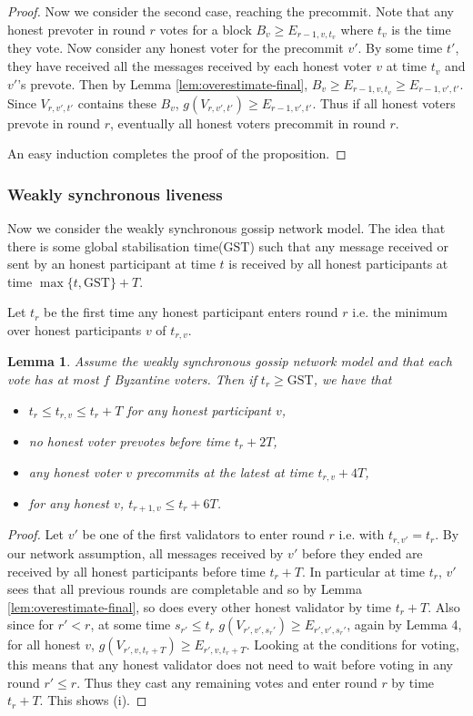 \documentclass{article}
\newtheorem{lemma}[theorem]{Lemma}
\begin{document}
{\begin{proof}
Now we consider the second case, reaching the precommit. 
Note that any honest prevoter in round $r$ votes for a block $B_v \geq E_{r-1,v,t_v}$ where $t_v$ is the time they vote. Now consider any honest voter for the precommit $v'$. By some time $t'$, they have received all the messages received by each honest voter $v$ at time $t_v$ and $v'$'s prevote. 
Then by Lemma \ref{lem:overestimate-final}, $B_v \geq E_{r-1,v,t_v} \geq E_{r-1,v',t'}$. Since $V_{r,v',t'}$ contains these $B_v$, $g(V_{r,v',t'}) \geq  E_{r-1,v',t'}$. Thus if all honest voters prevote in round $r$, eventually all honest voters precommit in round $r$.

An easy induction completes the proof of the proposition.
\end{proof}

\subsubsection{Weakly synchronous liveness}

Now we consider the weakly synchronous gossip network model. The idea that there is some global stabilisation time($\textrm{GST}$) such that any message received or sent by an honest participant at time $t$ is received by all honest participants at time $\max\{t,\textrm{GST}\}+T$.

Let $t_r$ be the first time any honest participant enters round $r$ i.e. the minimum over honest participants $v$ of $t_{r,v}$.

\begin{lemma} \label{lem:timings}
Assume the weakly synchronous gossip network model and that each vote has at most $f$ Byzantine voters. Then if $t_r \geq \textrm{GST}$, we have that
\begin{itemize}
\item[(i)] $t_r \leq t_{r,v} \leq t_r+T$ for any honest participant $v$,
\item[(ii)] no honest voter prevotes before time $t_r+2T$,
\item[(iii)] any honest voter $v$ precommits at the latest at time $t_{r,v}+4T$,
\item[(iv)] for any honest $v$, $t_{r+1,v} \leq t_r + 6T$.
\end{itemize}
\end{lemma}


\begin{proof} Let $v'$ be one of the first validators to enter round $r$ i.e. with $t_{r,v'}=t_r$. 
By our network assumption, all messages received by $v'$ before they ended are received by all honest participants before time $t_r+T$.
 In particular at time $t_r$, $v'$ sees that all previous rounds are completable and so by Lemma \ref{lem:overestimate-final}, so does every other honest validator by time $t_r+T$. Also since for $r' < r$, at some time $s_{r'} \leq t_r$ $g(V_{r',v',s_r'}) \geq E_{r',v',s_r'}$, again by Lemma 4, for all honest $v$, $g(V_{r',v,t_r+T}) \geq E_{r',v,t_r+T}$. Looking at the conditions for voting, this means that any honest validator does not need to wait before voting in any round $r' \leq r$. 
 Thus they cast any remaining votes and enter round $r$ by time $t_r + T$. This shows (i).


\end{proof}}
\end{document}
